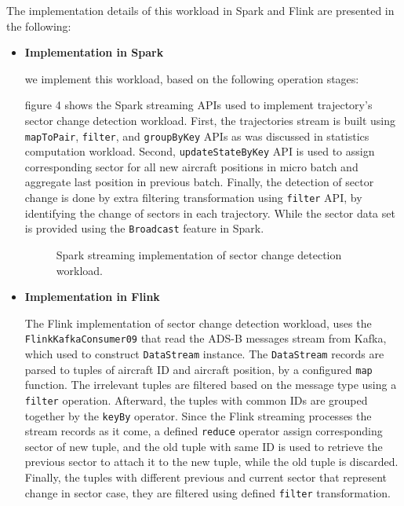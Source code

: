 \documentclass[]{article}
\begin{document}
 The implementation details of this workload in Spark and Flink are presented in the following: 
 \begin{itemize}
 \item {\bf{Implementation in Spark }}
 
 we implement this workload, based on the following operation stages: 
 
 figure 4 shows the Spark streaming APIs used to implement trajectory's sector change detection workload. First, the trajectories stream is built using \texttt{mapToPair}, \texttt{filter}, and \texttt{groupByKey} APIs as was discussed in statistics computation workload. Second,  \texttt{updateStateByKey} API is used to assign corresponding sector for all new aircraft positions in  micro batch  and aggregate last position in previous batch. Finally, the detection of sector change is done by extra filtering transformation using \texttt{filter} API, by identifying the change of sectors in each trajectory. While the sector data set is provided using the \texttt{Broadcast} feature in Spark.
 \begin{figure}[h]
  
   \centering
   
      \caption{Spark streaming implementation of sector change detection workload.}
 \end{figure} 
 
  
 \item {\bf{Implementation in Flink }}
 
 The Flink implementation of sector change detection workload, uses the \texttt{FlinkKafkaConsumer09} that read the ADS-B messages stream from Kafka, which used to construct \texttt{DataStream} instance. The \texttt{DataStream} records are parsed to tuples of aircraft ID and aircraft position, by a configured \texttt{map} function. The irrelevant tuples are filtered based on the message type using a \texttt{filter} operation. Afterward, the tuples with common IDs are grouped together by the \texttt{keyBy} operator. Since the Flink streaming processes the stream records as it come, a defined \texttt{reduce} operator assign corresponding sector of new tuple, and the old tuple with same ID is used to retrieve the previous sector to attach it to the new tuple, while the old tuple is discarded. Finally, the tuples with different previous and current sector that represent change in sector case, they are filtered using defined \texttt{filter} transformation.
 \end{itemize}
\end{document}
